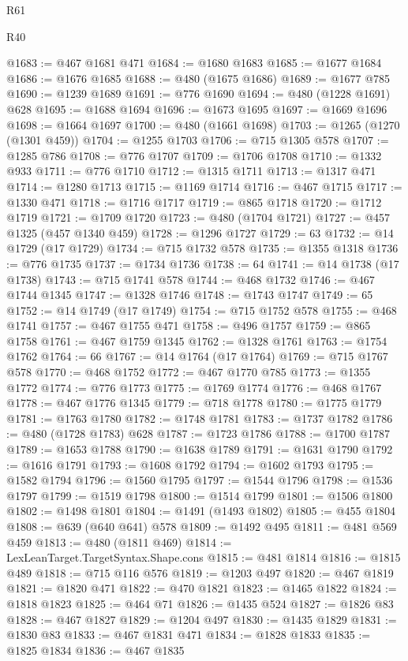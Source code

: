 \begin{lexlean}{R61}
\begin{lexlean}{R40}
\begin{coremodule}
{{{{{{{{{{{{{{{{{{{{{{{{{{{{{{{{{{{{{{{{{{{{{{{{{{{{{{{{{{{{{{{{{{{{{{{{{{{{{{{{{{{{{{{{{{{{{{{{{{{{{{{{{{{{{@1683 := @467 @1681 @471
@1684 := @1680 @1683
@1685 := @1677 @1684
@1686 := @1676 @1685
@1688 := @480 (@1675 @1686)
@1689 := @1677 @785
@1690 := @1239 @1689
@1691 := @776 @1690
@1694 := @480 (@1228 @1691) @628
@1695 := @1688 @1694
@1696 := @1673 @1695
@1697 := @1669 @1696
@1698 := @1664 @1697
@1700 := @480 (@1661 @1698)
@1703 := @1265 (@1270 (@1301 @459))
@1704 := @1255 @1703
@1706 := @715 @1305 @578
@1707 := @1285 @786
@1708 := @776 @1707
@1709 := @1706 @1708
@1710 := @1332 @933
@1711 := @776 @1710
@1712 := @1315 @1711
@1713 := @1317 @471
@1714 := @1280 @1713
@1715 := @1169 @1714
@1716 := @467 @1715
@1717 := @1330 @471
@1718 := @1716 @1717
@1719 := @865 @1718
@1720 := @1712 @1719
@1721 := @1709 @1720
@1723 := @480 (@1704 @1721)
@1727 := @457 @1325 (@457 @1340 @459)
@1728 := @1296 @1727
@1729 := 63
@1732 := @14 @1729 (@17 @1729)
@1734 := @715 @1732 @578
@1735 := @1355 @1318
@1736 := @776 @1735
@1737 := @1734 @1736
@1738 := 64
@1741 := @14 @1738 (@17 @1738)
@1743 := @715 @1741 @578
@1744 := @468 @1732
@1746 := @467 @1744 @1345
@1747 := @1328 @1746
@1748 := @1743 @1747
@1749 := 65
@1752 := @14 @1749 (@17 @1749)
@1754 := @715 @1752 @578
@1755 := @468 @1741
@1757 := @467 @1755 @471
@1758 := @496 @1757
@1759 := @865 @1758
@1761 := @467 @1759 @1345
@1762 := @1328 @1761
@1763 := @1754 @1762
@1764 := 66
@1767 := @14 @1764 (@17 @1764)
@1769 := @715 @1767 @578
@1770 := @468 @1752
@1772 := @467 @1770 @785
@1773 := @1355 @1772
@1774 := @776 @1773
@1775 := @1769 @1774
@1776 := @468 @1767
@1778 := @467 @1776 @1345
@1779 := @718 @1778
@1780 := @1775 @1779
@1781 := @1763 @1780
@1782 := @1748 @1781
@1783 := @1737 @1782
@1786 := @480 (@1728 @1783) @628
@1787 := @1723 @1786
@1788 := @1700 @1787
@1789 := @1653 @1788
@1790 := @1638 @1789
@1791 := @1631 @1790
@1792 := @1616 @1791
@1793 := @1608 @1792
@1794 := @1602 @1793
@1795 := @1582 @1794
@1796 := @1560 @1795
@1797 := @1544 @1796
@1798 := @1536 @1797
@1799 := @1519 @1798
@1800 := @1514 @1799
@1801 := @1506 @1800
@1802 := @1498 @1801
@1804 := @1491 (@1493 @1802)
@1805 := @455 @1804
@1808 := @639 (@640 @641) @578
@1809 := @1492 @495
@1811 := @481 @569 @459
@1813 := @480 (@1811 @469)
@1814 := LexLeanTarget.TargetSyntax.Shape.cons
@1815 := @481 @1814
@1816 := @1815 @489
@1818 := @715 @116 @576
@1819 := @1203 @497
@1820 := @467 @1819
@1821 := @1820 @471
@1822 := @470 @1821
@1823 := @1465 @1822
@1824 := @1818 @1823
@1825 := @464 @71
@1826 := @1435 @524
@1827 := @1826 @83
@1828 := @467 @1827
@1829 := @1204 @497
@1830 := @1435 @1829
@1831 := @1830 @83
@1833 := @467 @1831 @471
@1834 := @1828 @1833
@1835 := @1825 @1834
@1836 := @467 @1835
}}}}}}}}}}}}}}}}}}}}}}}}}}}}}}}}}}}}}}}}}}}}}}}}}}}}}}}}}}}}}}}}}}}}}}}}}}}}}}}}}}}}}}}}}}}}}}}}}}}}}}}}}}}}}
\end{coremodule}
\end{lexlean}
\end{lexlean}
